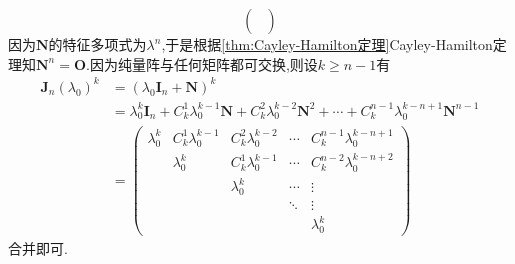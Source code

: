 \begin{brown}
\begin{solution}
\[\begin{pmatrix}
        \\
        \\
        \\
    \end{pmatrix}
    \]因为$\bm{N}$的特征多项式为$\lambda^n$,于是根据\cref{thm:Cayley-Hamilton定理}\textup{Cayley-Hamilton}定理知$\bm{N}^n=\bm{O}.$因为纯量阵与任何矩阵都可交换,则设$k\geqslant n-1$有\begin{align*}
        \bm{J}_n\left(\lambda_0\right)^k&=\left(\lambda_0\bm{I}_n+\bm{N}\right)^k\\
        &=\lambda_0^k\bm{I}_n+C_k^1\lambda_0^{k-1}\bm{N}+C_k^2\lambda_0^{k-2}\bm{N}^2+\cdots+C_k^{n-1}\lambda_0^{k-n+1}\bm{N}^{n-1}\\
        &=\begin{pmatrix}
            \lambda_0^k&C_k^1\lambda_0^{k-1}&C_k^2\lambda_0^{k-2}&\cdots&C_k^{n-1}\lambda_0^{k-n+1}\\
            &\lambda_0^k&C_k^1\lambda_0^{k-1}&\cdots&C_k^{n-2}\lambda_0^{k-n+2}\\
            &&\lambda_0^k&\cdots&\vdots\\
            &&&\ddots&\vdots\\
            &&&&\lambda_0^k
        \end{pmatrix}
    \end{align*}合并即可.
    \end{solution}
\end{brown}

